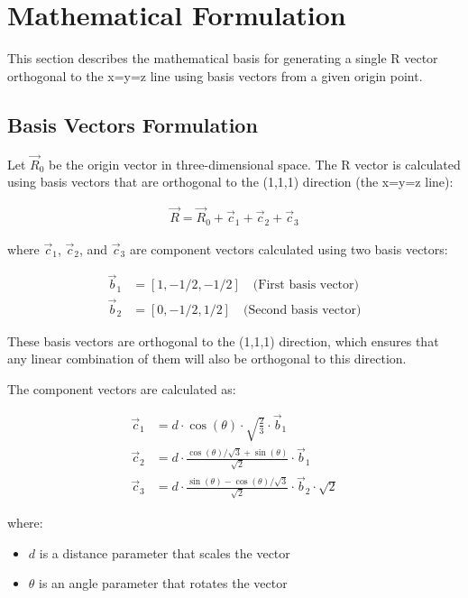 \newpage
\section{Mathematical Formulation}

This section describes the mathematical basis for generating a single R vector orthogonal to the x=y=z line using basis vectors from a given origin point.

\subsection{Basis Vectors Formulation}

Let $\vec{R}_0$ be the origin vector in three-dimensional space. The R vector is calculated using basis vectors that are orthogonal to the (1,1,1) direction (the x=y=z line):

\begin{align}
\vec{R} = \vec{R}_0 + \vec{c}_1 + \vec{c}_2 + \vec{c}_3
\end{align}

where $\vec{c}_1$, $\vec{c}_2$, and $\vec{c}_3$ are component vectors calculated using two basis vectors:

\begin{align}
\vec{b}_1 &= [1, -1/2, -1/2] \quad \text{(First basis vector)} \\
\vec{b}_2 &= [0, -1/2, 1/2] \quad \text{(Second basis vector)}
\end{align}

These basis vectors are orthogonal to the (1,1,1) direction, which ensures that any linear combination of them will also be orthogonal to this direction.

The component vectors are calculated as:

\begin{align}
\vec{c}_1 &= d \cdot \cos(\theta) \cdot \sqrt{\frac{2}{3}} \cdot \vec{b}_1 \\
\vec{c}_2 &= d \cdot \frac{\cos(\theta)/\sqrt{3} + \sin(\theta)}{\sqrt{2}} \cdot \vec{b}_1 \\
\vec{c}_3 &= d \cdot \frac{\sin(\theta) - \cos(\theta)/\sqrt{3}}{\sqrt{2}} \cdot \vec{b}_2 \cdot \sqrt{2}
\end{align}

where:
\begin{itemize}
    \item $d$ is a distance parameter that scales the vector
    \item $\theta$ is an angle parameter that rotates the vector
\end{itemize}


